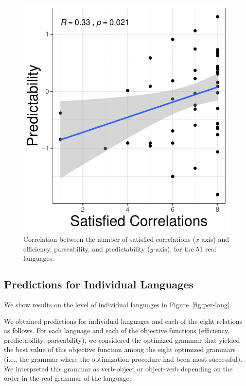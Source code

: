 \documentclass[10pt,twoside,lineno]{article}
\begin{document}
\begin{figure}[ht]
    \includegraphics[scale=.55]{../results/correlations/correlations-by-grammar/ground-corrs-predictability.pdf}

	\caption{Correlation between the number of satisfied correlations ($x$-axis) and efficiency, parseability, and predictability ($y$-axis), for the 51 real languages.}
    \label{fig:corr-eff-corr}
\end{figure}



\subsection{Predictions for Individual Languages}


We show results on the level of individual languages in Figure~\ref{fig:per-lang}.

We obtained predictions for individual languages and each of the eight relations as follows.
For each language and each of the objective functions (efficiency, predictability, parseability), we considered the optimized grammar that yielded the best value of this objective function among the eight optimized grammars (i.e., the grammar where the optimization procedure had been most successful).
We interpreted this grammar as verb-object or object-verb depending on the order in the real grammar of the language.
\end{document}
